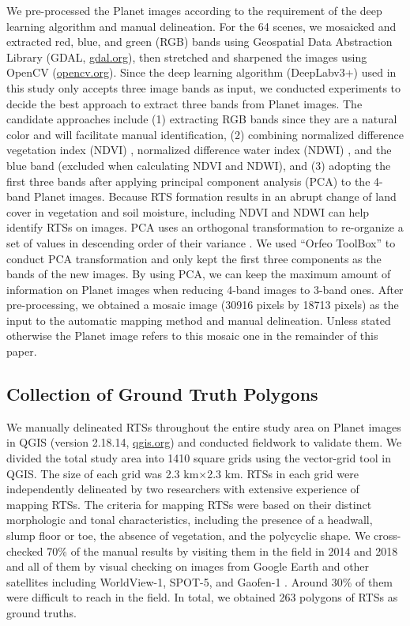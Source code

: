 \documentclass[authoryear,preprint,review,12pt]{elsarticle}
\begin{document}
We pre-processed the Planet images according to the requirement of the deep learning algorithm and manual delineation. For the 64 scenes, we mosaicked and extracted red, blue, and green (RGB) bands using Geospatial Data Abstraction Library (GDAL, \url{gdal.org}), then stretched and sharpened the images using OpenCV (\url{opencv.org}). Since the deep learning algorithm (DeepLabv3+) used in this study only accepts three image bands as input, we conducted experiments to decide the best approach to extract three bands from Planet images. The candidate approaches include (1) extracting RGB bands since they are a natural color and will facilitate manual identification, (2) combining normalized difference vegetation index (NDVI) \citep{rouse1974monitoring}, normalized difference water index (NDWI) \citep{mcfeeters1996use}, and the blue band (excluded when calculating NDVI and NDWI), and (3) adopting the first three bands after applying principal component analysis (PCA) to the 4-band Planet images. Because RTS formation results in an abrupt change of land cover in vegetation and soil moisture, including NDVI and NDWI can help identify RTSs on images. PCA uses an orthogonal transformation to re-organize a set of values in descending order of their variance \citep{wold1987principal}. We used ``Orfeo ToolBox'' \citep{inglada2009orfeo} to conduct PCA transformation and only kept the first three components as the bands of the new images. By using PCA, we can keep the maximum amount of information on Planet images when reducing 4-band images to 3-band ones. 
 After pre-processing, we obtained a mosaic image (30916 pixels by 18713 pixels) as the input to the automatic mapping method and manual delineation. Unless stated otherwise the Planet image refers to this mosaic one in the remainder of this paper.

\subsection{Collection of Ground Truth Polygons}
\label{subsec_collect_groundtruth}

We manually delineated RTSs throughout the entire study area on Planet images in QGIS (version 2.18.14, \url{qgis.org}) and conducted fieldwork to validate them. We divided the total study area into 1410 square grids using the vector-grid tool in QGIS. The size of each grid was 2.3 km$\times$2.3 km. RTSs in each grid were independently delineated by two researchers with extensive experience of mapping RTSs. 
The criteria for mapping RTSs were based on their distinct morphologic and tonal characteristics, including the presence of a headwall, slump floor or toe, the absence of vegetation, and the polycyclic shape. We cross-checked 70\% of the manual results by visiting them in the field in 2014 and 2018 and all of them by visual checking on images from Google Earth and other satellites including WorldView-1, SPOT-5, and Gaofen-1 \citep{luo2019recent}. Around 30\% of them were difficult to reach in the field. In total, we obtained 263 polygons of RTSs as ground truths.  
\end{document}

